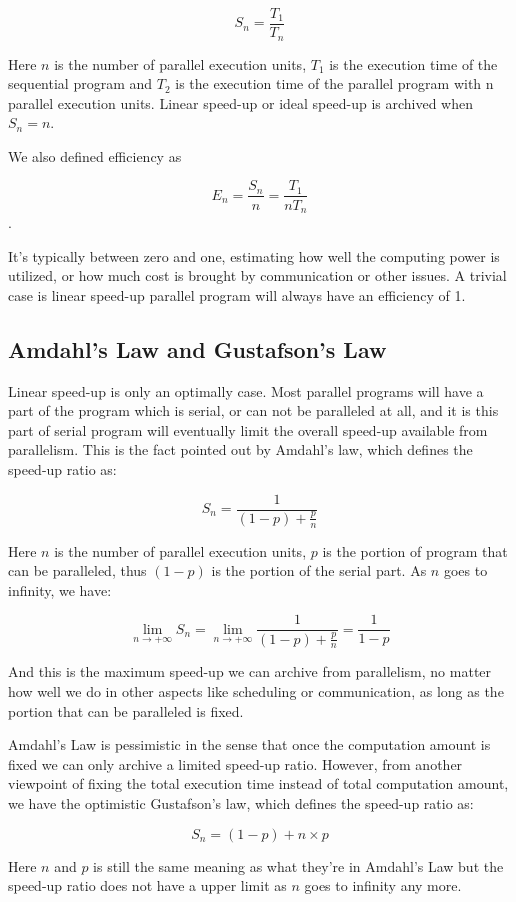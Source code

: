 \documentclass[12pt,a4]{report}
\begin{document}
$$ S_n = \frac{T_1}{T_n} $$

Here $n$ is the number of parallel execution units, $T_1$ is the execution time of the sequential program and $T_2$ is the execution time of the parallel program with n parallel execution units. Linear speed-up or ideal speed-up is archived when $S_n = n$. 

We also defined efficiency as

$$ E_n = \frac{S_n}{n} = \frac{T_1}{nT_n} $$.

It's typically between zero and one, estimating how well the computing power is utilized, or how much cost is brought by communication or other issues. A trivial case is linear speed-up parallel program will always have an efficiency of 1.

\subsection{Amdahl's Law and Gustafson's Law}

Linear speed-up is only an optimally case. Most parallel programs will have a part of the program which is serial, or can not be paralleled at all, and it is this part of serial program will eventually limit the overall speed-up available from parallelism. This is the fact pointed out by Amdahl's law, which defines the speed-up ratio as:

$$ S_n = \frac{1}{(1 - p) + \frac{p}{n}} $$

Here $n$ is the number of parallel execution units, $p$ is the portion of program that can be paralleled, thus $(1-p)$ is the portion of the serial part. As $n$ goes to infinity, we have:

$$ \lim_{n \to +\infty} S_n = \lim_{n \to +\infty} \frac{1}{(1 - p) + \frac{p}{n}} = \frac{1}{1 - p} $$

And this is the maximum speed-up we can archive from parallelism, no matter how well we do in other aspects like scheduling or communication, as long as the portion that can be paralleled is fixed.

Amdahl's Law is pessimistic in the sense that once the computation amount is fixed we can only archive a limited speed-up ratio. However, from another viewpoint of fixing the total execution time instead of total computation amount, we have the optimistic Gustafson's law, which defines the speed-up ratio as:

$$ S_n = (1 - p) + n \times p $$

Here $n$ and $p$ is still the same meaning as what they're in Amdahl's Law but the speed-up ratio does not have a upper limit as $n$ goes to infinity any more.
\end{document}
